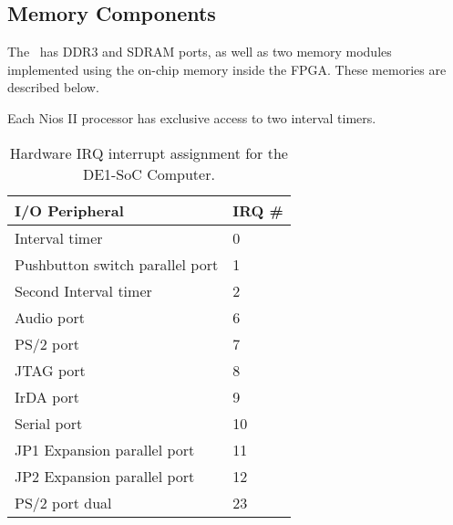 





\subsection{Memory Components}

The \systemName~has DDR3 and SDRAM ports, as well as two memory modules implemented 
using the on-chip memory inside the FPGA. These memories are described below.

















Each Nios II processor has exclusive access to two interval timers.






\begin{table}[h]
    \begin{center}
    \begin{tabular}{l|l}
            \textbf{I/O Peripheral} &
            \textbf{IRQ \#}
        \\\hline
            Interval timer & 0
        \\
            Pushbutton switch parallel port & 1
        \\
            Second Interval timer & 2
        \\
            Audio port & 6
        \\
            PS/2 port & 7
        \\
            JTAG port & 8
        \\
						IrDA port & 9
				\\
            Serial port & 10
        \\
            JP1 Expansion parallel port & 11
        \\
            JP2 Expansion parallel port & 12
        \\
						PS/2 port dual & 23
				\\
    \end{tabular}
    \caption{Hardware IRQ interrupt assignment for the DE1-SoC Computer.}
	 \label{tab:irq}
    \end{center}
\end{table}
\newpage

